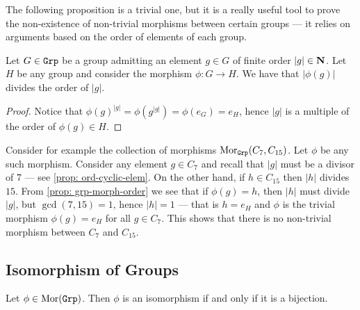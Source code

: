 The following proposition is a trivial one, but it is a really useful tool to
prove the non-existence of non-trivial morphisms between certain groups --- it
relies on arguments based on the order of elements of each group.

\begin{proposition}\label{prop: grp-morph-order}
    Let \(G \in {\texttt{Grp}}\) be a group admitting an element \(g \in G\) of finite order
    \(|g| \in \mathbf{N}\). Let \(H\) be any group and consider the morphism \(\phi: G \to
    H\). We have that \(|\phi(g)|\) divides the order of \(|g|\).
\end{proposition}

\begin{proof}
    Notice that \({\phi(g)}^{|g|} = \phi(g^{|g|}) = \phi(e_G) = e_H\), hence \(|g|\)
    is a multiple of the order of \(\phi(g) \in H\).
\end{proof}

\begin{example}
    Consider for example the collection of morphisms \(\operatorname{Mor}_{\texttt{Grp}}(C_7, C_{15})\).
    Let \(\phi\) be any such morphism. Consider any element \(g \in C_7\) and
    recall that \(|g|\) must be a divisor of \(7\) --- see \cref{prop:
        ord-cyclic-elem}. On the other hand, if \(h \in C_{15}\) then \(|h|\) divides
    \(15\). From \cref{prop: grp-morph-order} we see that if \(\phi(g) = h\), then
    \(|h|\) must divide \(|g|\), but \(\gcd(7, 15) = 1\), hence
    \(|h| = 1\) --- that is \(h = e_H\) and \(\phi\) is the trivial morphism
    \(\phi(g) = e_H\) for all \(g \in C_7\). This shows that there is no
    non-trivial morphism between \(C_7\) and \(C_{15}\).
\end{example}

\subsection{Isomorphism of Groups}

\begin{proposition}\label{prop: grp-iso-bij}
    Let \(\phi \in \operatorname{Mor}({\texttt{Grp}})\). Then \(\phi\) is an isomorphism if and only if it
    is a bijection.
\end{proposition}

